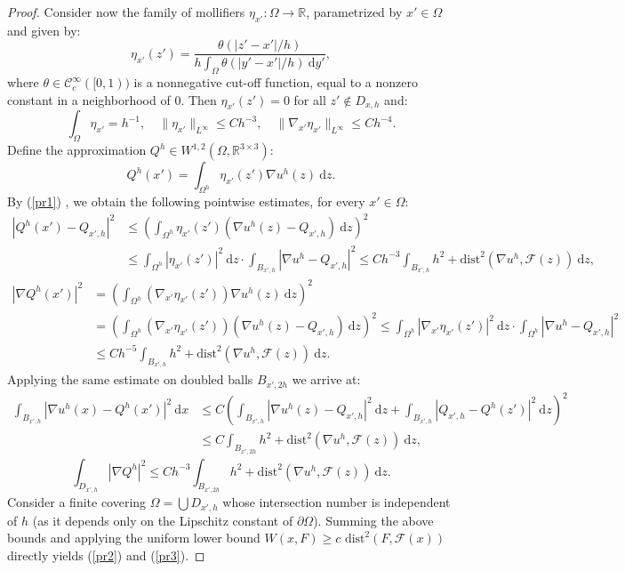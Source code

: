 \documentclass[leqno,twoside, 11pt]{amsart}
\theoremstyle{plain}
\theoremstyle{definition}
\numberwithin{equation}{section}
\numberwithin{figure}{section}
\begin{document}
\begin{proof}
Consider now the family of mollifiers 
$\eta_{x'}:\Omega\longrightarrow \mathbb{R}$,
parametrized by $x'\in\Omega$ and given by:
$$\eta_{x'}(z') 
= \frac{\theta(|z' - x'|/h)}{h\int_{\Omega}\theta(|y'-x'|/h)~\mbox{d}y'},$$
where $\theta\in\mathcal{C}_c^\infty([0,1))$ is a nonnegative cut-off function, 
equal to a nonzero constant in a neighborhood of $0$. Then $\eta_{x'}(z')=0$
for all $z'\not\in D_{x,h}$ and:
$$\int_\Omega \eta_{x'} = h^{-1},\quad
\|\eta_{x'}\|_{L^\infty}\leq Ch^{-3}, \quad 
\|\nabla_{x'}\eta_{x'}\|_{L^\infty}\leq Ch^{-4}.$$
Define the approximation $Q^h\in W^{1,2}(\Omega,\mathbb{R}^{3\times 3})$:
$$Q^h(x')= \int_{\Omega^h} \eta_{x'}(z') \nabla u^h(z)~\mbox{d}z.$$
By (\ref{pr1}) , we obtain the following pointwise estimates, for every $x'\in\Omega$:
\begin{equation*}
\begin{split}
|Q^h(x') - Q_{x',h}|^2 &\leq \left( \int_{\Omega^h}\eta_{x'}(z') 
\left(\nabla u^h(z) - Q_{x',h}\right)~\mbox{d}z\right)^2 \\
&\leq \int_{\Omega^h}|\eta_{x'}(z')|^2~\mbox{d}z \cdot
\int_{B_{x',h}} |\nabla u^h - Q_{x',h}|^2
\leq Ch^{-3} \int_{B_{x',h}} h^2 + \mbox{dist}^2(\nabla u^h,\mathcal{F}(z))
~\mbox{d}z,
\end{split}
\end{equation*}
\begin{equation*}
\begin{split}
|\nabla Q^h(x')|^2 & = \left(\int_{\Omega^h}(\nabla_{x'}\eta_{x'}(z'))
\nabla u^h(z)~\mbox{d}z\right)^2\\
& = \left(\int_{\Omega^h}(\nabla_{x'}\eta_{x'}(z'))
\left(\nabla u^h(z) - Q_{x',h}\right)~\mbox{d}z\right)^2
\leq \int_{\Omega^h}|\nabla_{x'}\eta_{x'}(z')|^2~\mbox{d}z \cdot
\int_{\Omega^h} |\nabla u^h - Q_{x',h}|^2\\
&\leq C h^{-5} \int_{B_{x',h}} h^2 + \mbox{dist}^2(\nabla u^h,\mathcal{F}(z))
~\mbox{d}z.
\end{split}
\end{equation*}
Applying the same estimate on doubled balls $B_{x', 2h}$ we arrive at:
\begin{equation*}
\begin{split}
\int_{B_{x',h}}|\nabla u^h(x) - Q^h(x')|^2~\mbox{d}x &\leq 
C \left( \int_{B_{x',h}}|\nabla u^h(z) - Q_{x',h}|^2~\mbox{d}z
+ \int_{B_{x',h}}|Q_{x',h} - Q^h(z')|^2~\mbox{d}z\right)^2\\
&\leq C \int_{B_{x',2h}} h^2 + \mbox{dist}^2(\nabla u^h,\mathcal{F}(z))~\mbox{d}z,
\end{split}
\end{equation*}
\begin{equation*}
\int_{D_{x',h}}|\nabla Q^h|^2 \leq 
Ch^{-3} \int_{B_{x',2h}} h^2 
+ \mbox{dist}^2(\nabla u^h,\mathcal{F}(z))~\mbox{d}z.
\end{equation*}
Consider a finite covering $\Omega = \bigcup D_{x',h}$  
whose intersection number is independent of $h$ (as it depends only on the 
Lipschitz constant of $\partial\Omega$). 
Summing the above bounds and applying the uniform lower bound 
$W(x,F) \geq c \mbox{ dist}^2(F,\mathcal{F}(x))$ directly yields 
(\ref{pr2}) and (\ref{pr3}).
\end{proof}
\end{document}
